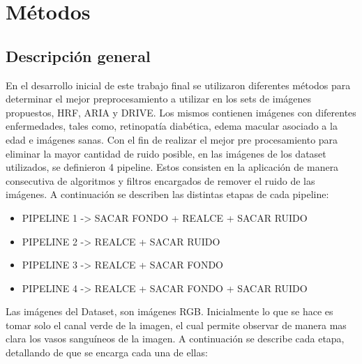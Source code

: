 
\chapter{M\'etodos} %

\label{Chapter3} %


\section{Descripci\'on general}

En el desarrollo inicial de este trabajo final se utilizaron diferentes m\'etodos para determinar el mejor preprocesamiento a utilizar en los sets de im\'agenes propuestos, HRF, ARIA y DRIVE. Los mismos contienen im\'agenes con diferentes enfermedades, tales como, retinopat\'ia diab\'etica, edema macular asociado a la edad e im\'agenes sanas.
Con el fin de realizar el mejor pre procesamiento para eliminar la mayor cantidad de ruido posible, en las imágenes de los dataset utilizados, se definieron 4 pipeline. Estos consisten en la aplicación de manera consecutiva de algoritmos y filtros encargados de remover el ruido de las imágenes. A continuación se describen las distintas etapas de cada pipeline:

\begin{itemize}
    \item PIPELINE 1 -> SACAR  FONDO  +  REALCE  +  SACAR  RUIDO
		\item PIPELINE 2 -> REALCE +  SACAR  RUIDO
		\item PIPELINE 3 -> REALCE +  SACAR  FONDO
		\item PIPELINE 4 -> REALCE  + SACAR  FONDO   +  SACAR  RUIDO
\end{itemize}

Las imágenes del Dataset, son imágenes RGB. Inicialmente lo que se hace es tomar solo el canal verde de la imagen, el cual permite observar de manera mas clara los vasos sanguíneos de la imagen. A continuación se describe cada etapa, detallando de que se encarga cada una de ellas:

